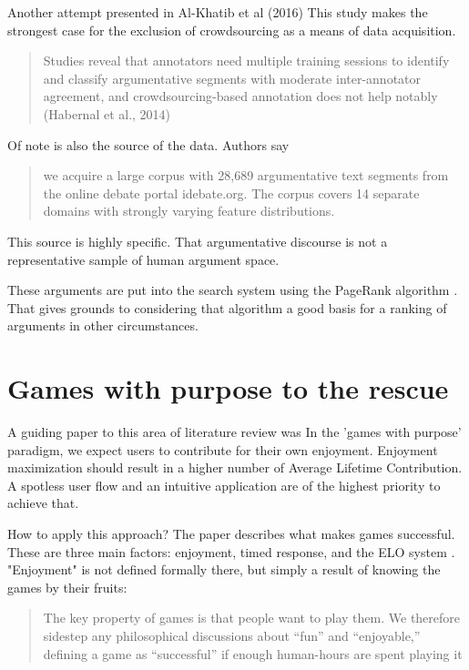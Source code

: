 \documentclass{report}
\begin{document}
Another attempt presented in Al-Khatib et al (2016) \cite{al-khatib_cross-domain_2016}
This study makes the strongest case for the exclusion of crowdsourcing as a means of data acquisition.
\begin{quote}
 Studies reveal that annotators need multiple training sessions to identify and classify argumentative segments with moderate inter-annotator agreement, and crowdsourcing-based annotation does not help notably (Habernal et al., 2014)
\end{quote}\cite[page 1395]{al-khatib_cross-domain_2016}
Of note is also the source of the data. Authors say
\begin{quote}
 we acquire a large corpus with 28,689 argumentative text segments from the online debate portal idebate.org. The corpus covers 14 separate domains with strongly varying feature distributions.
\end{quote}\cite[page 1396]{al-khatib_cross-domain_2016}
This source is highly specific. That argumentative discourse is not a representative sample of human argument space.  

These arguments are put into the search system using the PageRank algorithm \cite{brin_anatomy_1998}.  That gives grounds to considering that algorithm a good basis for a ranking of arguments in other circumstances.

\section{Games with purpose to the rescue}
A guiding paper to this area of literature review was \cite{von_ahn_designing_2008} 
In the 'games with purpose' paradigm, we expect users to contribute for their own enjoyment. Enjoyment maximization should result in a higher number of Average Lifetime Contribution.  A spotless user flow and an intuitive application are of the highest priority to achieve that.

How to apply this approach? The paper describes what makes games successful.
These are three main factors: enjoyment, timed response, and the ELO system \cite{noauthor_elo_2023}.
"Enjoyment" is not defined formally there, but simply a result of knowing the games by their fruits:

\begin{quote}
 The key property of games is that people want to play them. We therefore sidestep any philosophical discussions about “fun” and “enjoyable,” defining a game as “successful” if enough human-hours are spent playing it
\end{quote}\cite[page 61]{von_ahn_designing_2008} 
\end{document}
